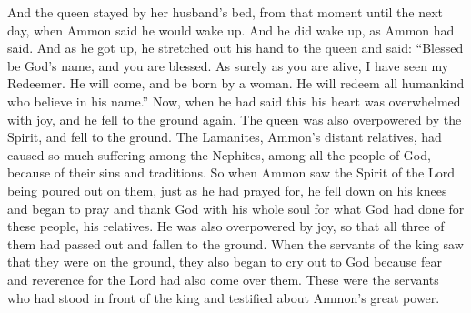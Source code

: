 And the queen stayed by her husband's bed, from that moment until the next day, when Ammon said he would wake up.
\bverse \iffalse And it came to pass that he arose, according to the words of Ammon; and as he arose, he stretched forth his hand unto the woman, and said: Blessed be the name of God, and blessed art thou. \fi
And he did wake up, as Ammon had said. And as he got up, he stretched out his hand to the queen and said: ``Blessed be God's name, and you are blessed.
\bverse \iffalse For as sure as thou livest, behold, I have seen my Redeemer; and he shall come forth, and be born of a woman, and he shall redeem all mankind who believe on his name. Now, when he had said these words, his heart was swollen within him, and he sunk again with joy; and the queen also sunk down, being overpowered by the Spirit. \fi
As surely as you are alive, I have seen my Redeemer. He will come, and be born by a woman. He will redeem all humankind who believe in his name.'' Now, when he had said this his heart was overwhelmed with joy, and he fell to the ground again. The queen was also overpowered by the Spirit, and fell to the ground.
\bverse \iffalse Now Ammon seeing the Spirit of the Lord poured out according to his prayers upon the Lamanites, his brethren, who had been the cause of so much mourning among the Nephites, or among all the people of God because of their iniquities and their traditions, he fell upon his knees, and began to pour out his soul in prayer and thanksgiving to God for what he had done for his brethren; and he was also overpowered with joy; and thus they all three had sunk to the earth. \fi
The Lamanites, Ammon's distant relatives, had caused so much suffering among the Nephites, among all the people of God, because of their sins and traditions. So when Ammon saw the Spirit of the Lord being poured out on them, just as he had prayed for, he fell down on his knees and began to pray and thank God with his whole soul for what God had done for these people, his relatives. He was also overpowered by joy, so that all three of them had passed out and fallen to the ground.
\bverse \iffalse Now, when the servants of the king had seen that they had fallen, they also began to cry unto God, for the fear of the Lord had come upon them also, for it was they who had stood before the king and testified unto him concerning the great power of Ammon. \fi
When the servants of the king saw that they were on the ground, they also began to cry out to God because fear and reverence for the Lord had also come over them. These were the servants who had stood in front of the king and testified about Ammon's great power.
